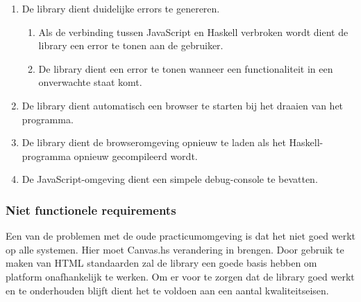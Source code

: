 \begin{enumerate}[label={R\arabic*}]
\setcounter{enumi}{\value{startvalue}}
	\item \label{req:errors} De library dient duidelijke errors te genereren.
	\begin{enumerate}[label={R\arabic{enumi}.\arabic*}]
		\item Als de verbinding tussen JavaScript en Haskell verbroken wordt dient de library een error te tonen aan de gebruiker. 
		\item De library dient een error te tonen wanneer een functionaliteit in een onverwachte staat komt.
	\end{enumerate}
	\item \label{req:launchbrowser} De library dient automatisch een browser te starten bij het draaien van het programma.
	\item \label{req:reload} De library dient de browseromgeving opnieuw te laden als het Haskell-programma opnieuw gecompileerd wordt.
	\item \label{req:debug} De JavaScript-omgeving dient een simpele debug-console te bevatten.
	\setcounter{startvalue}{\value{enumi}}
\end{enumerate}

\subsubsection{Niet functionele requirements}
Een van de problemen met de oude practicumomgeving is dat het niet goed werkt op alle systemen. Hier moet Canvas.hs verandering in brengen. Door gebruik te maken van HTML standaarden zal de library een goede basis hebben om platform onafhankelijk te werken. Om er voor te zorgen dat de library goed werkt en te onderhouden blijft dient het te voldoen aan een aantal kwaliteitseisen.

